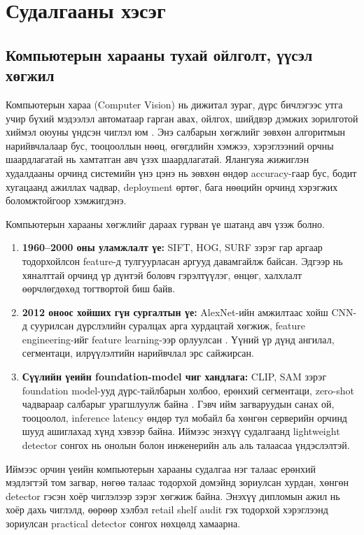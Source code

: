 \chapter{Судалгааны хэсэг}

\section{Компьютерын харааны тухай ойлголт, үүсэл хөгжил}
Компьютерын хараа (Computer Vision) нь дижитал зураг, дүрс бичлэгээс утга учир бүхий мэдээлэл автоматаар гарган авах, ойлгох, шийдвэр дэмжих зорилготой хиймэл оюуны үндсэн чиглэл юм \cite{real_time_detection}. Энэ салбарын хөгжлийг зөвхөн алгоритмын нарийвчлалаар бус, тооцооллын нөөц, өгөгдлийн хэмжээ, хэрэглээний орчны шаардлагатай нь хамтатган авч үзэх шаардлагатай. Ялангуяа жижиглэн худалдааны орчинд системийн үнэ цэнэ нь зөвхөн өндөр accuracy-гаар бус, бодит хугацаанд ажиллах чадвар, deployment өртөг, бага нөөцийн орчинд хэрэгжих боломжтойгоор хэмжигдэнэ.

Компьютерын харааны хөгжлийг дараах гурван үе шатанд авч үзэж болно.

\begin{enumerate}
\item \textbf{1960--2000 оны уламжлалт үе:} SIFT, HOG, SURF зэрэг гар аргаар тодорхойлсон feature-д тулгуурласан аргууд давамгайлж байсан. Эдгээр нь хяналттай орчинд үр дүнтэй боловч гэрэлтүүлэг, өнцөг, халхлалт өөрчлөгдөхөд тогтвортой биш байв.
\item \textbf{2012 оноос хойших гүн сургалтын үе:} AlexNet-ийн амжилтаас хойш CNN-д суурилсан дүрслэлийн суралцах арга хурдацтай хөгжиж, feature engineering-ийг feature learning-ээр орлуулсан \cite{alexnet}. Үүний үр дүнд ангилал, сегментаци, илрүүлэлтийн нарийвчлал эрс сайжирсан.
\item \textbf{Сүүлийн үеийн foundation-model чиг хандлага:} CLIP, SAM зэрэг foundation model-ууд дүрс-тайлбарын холбоо, ерөнхий сегментаци, zero-shot чадвараар салбарыг урагшлуулж байна \cite{clip,sam}. Гэвч ийм загваруудын санах ой, тооцоолол, inference latency өндөр тул мобайл ба хөнгөн серверийн орчинд шууд ашиглахад хүнд хэвээр байна. Иймээс энэхүү судалгаанд lightweight detector сонгох нь онолын болон инженерийн аль аль талаасаа үндэслэлтэй.
\end{enumerate}

Иймээс орчин үеийн компьютерын харааны судалгаа нэг талаас ерөнхий мэдлэгтэй том загвар, нөгөө талаас тодорхой домэйнд зориулсан хурдан, хөнгөн detector гэсэн хоёр чиглэлээр зэрэг хөгжиж байна. Энэхүү дипломын ажил нь хоёр дахь чиглэлд, өөрөөр хэлбэл retail shelf audit гэх тодорхой хэрэглээнд зориулсан practical detector сонгох нөхцөлд хамаарна.

